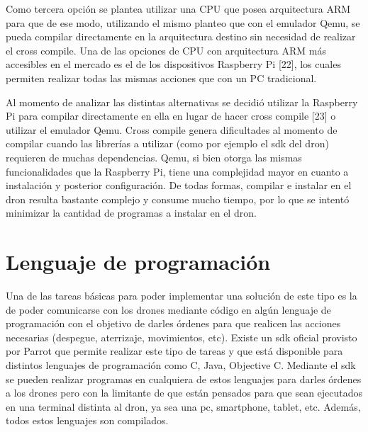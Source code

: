 Como tercera opción se plantea utilizar una CPU que posea arquitectura ARM para que de ese modo, utilizando el mismo planteo que con el emulador Qemu, se pueda compilar directamente en la arquitectura destino sin necesidad de realizar el cross compile. Una de las opciones de CPU con arquitectura ARM más accesibles en el mercado es el de los dispositivos Raspberry Pi [22], los cuales permiten realizar todas las mismas acciones que con un PC tradicional.

Al momento de analizar las distintas alternativas se decidió utilizar la Raspberry Pi para compilar directamente en ella en lugar de hacer cross compile [23] o utilizar el emulador Qemu. Cross compile genera dificultades al momento de compilar cuando las librerías a utilizar (como por ejemplo el sdk del dron) requieren de muchas dependencias. Qemu, si bien otorga las mismas funcionalidades que la Raspberry Pi, tiene una complejidad mayor en cuanto a instalación y posterior configuración.
De todas formas, compilar e instalar en el dron resulta bastante complejo y consume mucho tiempo, por lo que se intentó minimizar la cantidad de programas a instalar en el dron.
\section {Lenguaje de programación}
Una de las tareas básicas para poder implementar una solución de este tipo es la de poder comunicarse con los drones mediante código en algún lenguaje de programación con el objetivo de darles órdenes para que realicen las acciones necesarias (despegue, aterrizaje, movimientos, etc). Existe un sdk oficial provisto por Parrot que permite realizar este tipo de tareas y que está disponible para distintos lenguajes de programación como C, Java, Objective C. Mediante el sdk se pueden realizar programas en cualquiera de estos lenguajes para darles órdenes a los drones pero con la limitante de que están pensados para que sean ejecutados en una terminal distinta al dron, ya sea una pc, smartphone, tablet, etc. Además, todos estos lenguajes son compilados.

